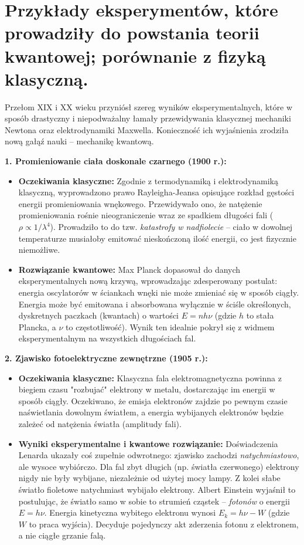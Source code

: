 \documentclass[11pt, a4paper]{article}
\begin{document}
\section{Przykłady eksperymentów, które prowadziły do powstania teorii kwantowej; porównanie z fizyką klasyczną.}

Przełom XIX i XX wieku przyniósł szereg wyników eksperymentalnych, które w sposób drastyczny i niepodważalny łamały przewidywania klasycznej mechaniki Newtona oraz elektrodynamiki Maxwella. Konieczność ich wyjaśnienia zrodziła nową gałąź nauki – mechanikę kwantową.

\textbf{1. Promieniowanie ciała doskonale czarnego (1900 r.):}
\begin{itemize}
    \item \textbf{Oczekiwania klasyczne:} Zgodnie z termodynamiką i elektrodynamiką klasyczną, wyprowadzono prawo Rayleigha-Jeansa opisujące rozkład gęstości energii promieniowania wnękowego. Przewidywało ono, że natężenie promieniowania rośnie nieograniczenie wraz ze spadkiem długości fali ($\rho \propto 1/\lambda^4$). Prowadziło to do tzw. \textit{katastrofy w nadfiolecie} – ciało w dowolnej temperaturze musiałoby emitować nieskończoną ilość energii, co jest fizycznie niemożliwe.
    \item \textbf{Rozwiązanie kwantowe:} Max Planck dopasował do danych eksperymentalnych nową krzywą, wprowadzając zdesperowany postulat: energia oscylatorów w ściankach wnęki nie może zmieniać się w sposób ciągły. Energia może być emitowana i absorbowana wyłącznie w ściśle określonych, dyskretnych paczkach (kwantach) o wartości $E = nh\nu$ (gdzie $h$ to stała Plancka, a $\nu$ to częstotliwość). Wynik ten idealnie pokrył się z widmem eksperymentalnym na wszystkich długościach fal.
\end{itemize}

\textbf{2. Zjawisko fotoelektryczne zewnętrzne (1905 r.):}
\begin{itemize}
    \item \textbf{Oczekiwania klasyczne:} Klasyczna fala elektromagnetyczna powinna z biegiem czasu "rozbujać" elektrony w metalu, dostarczając im energii w sposób ciągły. Oczekiwano, że emisja elektronów zajdzie po pewnym czasie naświetlania dowolnym światłem, a energia wybijanych elektronów będzie zależeć od natężenia światła (amplitudy fali).
    \item \textbf{Wyniki eksperymentalne i kwantowe rozwiązanie:} Doświadczenia Lenarda ukazały coś zupełnie odwrotnego: zjawisko zachodzi \textit{natychmiastowo}, ale wysoce wybiórczo. Dla fal zbyt długich (np. światła czerwonego) elektrony nigdy nie były wybijane, niezależnie od użytej mocy lampy. Z kolei słabe światło fioletowe natychmiast wybijało elektrony. Albert Einstein wyjaśnił to postulując, że światło samo w sobie to strumień cząstek – \textit{fotonów} o energii $E = h\nu$. Energia kinetyczna wybitego elektronu wynosi $E_k = h\nu - W$ (gdzie $W$ to praca wyjścia). Decyduje pojedynczy akt zderzenia fotonu z elektronem, a nie ciągłe grzanie falą.
\end{itemize}
\end{document}
